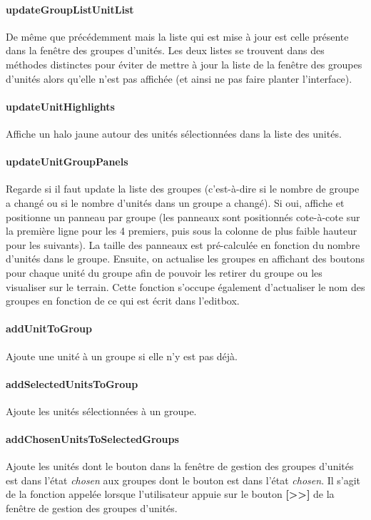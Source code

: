 \documentclass[a4paper]{article}
\begin{document}
\paragraph{updateGroupListUnitList} De même que précédemment mais la liste qui est mise à jour est celle présente dans la fenêtre des groupes d'unités. Les deux listes se trouvent dans des méthodes distinctes pour éviter de mettre à jour la liste de la fenêtre des groupes d'unités alors qu'elle n'est pas affichée (et ainsi ne pas faire planter l'interface).
\paragraph{updateUnitHighlights} Affiche un halo jaune autour des unités sélectionnées dans la liste des unités.
\paragraph{updateUnitGroupPanels} Regarde si il faut update la liste des groupes (c'est-à-dire si le nombre de groupe a changé ou si le nombre d'unités dans un groupe a changé). Si oui, affiche et positionne un panneau par groupe (les panneaux sont positionnés cote-à-cote sur la première ligne pour les 4 premiers, puis sous la colonne de plus faible hauteur pour les suivants). La taille des panneaux est pré-calculée en fonction du nombre d'unités dans le groupe. Ensuite, on actualise les groupes en affichant des boutons pour chaque unité du groupe afin de pouvoir les retirer du groupe ou les visualiser sur le terrain. Cette fonction s'occupe également d'actualiser le nom des groupes en fonction de ce qui est écrit dans l'editbox.
\paragraph{addUnitToGroup} Ajoute une unité à un groupe si elle n'y est pas déjà.
\paragraph{addSelectedUnitsToGroup} Ajoute les unités sélectionnées à un groupe.
\paragraph{addChosenUnitsToSelectedGroups} Ajoute les unités dont le bouton dans la fenêtre de gestion des groupes d'unités est dans l'état \textit{chosen} aux groupes dont le bouton est dans l'état \textit{chosen}. Il s'agit de la fonction appelée lorsque l'utilisateur appuie sur le bouton \textbf{[>>]} de la fenêtre de gestion des groupes d'unités.
\end{document}
